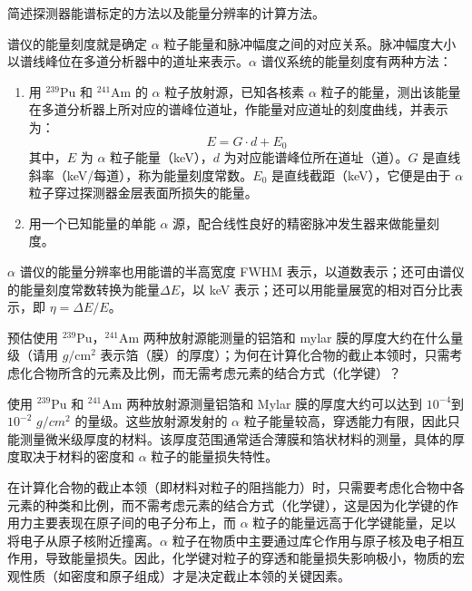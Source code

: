\documentclass[dvipsnames, svgnames,a4paper,11pt]{article}
\begin{document}
	

	


	




\begin{question}
	简述探测器能谱标定的方法以及能量分辨率的计算方法。
\end{question}

	谱仪的能量刻度就是确定 $\alpha$ 粒子能量和脉冲幅度之间的对应关系。脉冲幅度大小以谱线峰位在多道分析器中的道址来表示。$\alpha$ 谱仪系统的能量刻度有两种方法：

		\begin{enumerate}
			\item 用 $^{239} \mathrm{Pu}$ 和 $^{241} \mathrm{Am}$ 的 $\alpha$ 粒子放射源，已知各核素 $\alpha$ 粒子的能量，测出该能量在多道分析器上所对应的谱峰位道址，作能量对应道址的刻度曲线，并表示为：
			\[
				E = G \cdot d + E_0
			\]
			其中，$E$ 为 $\alpha$ 粒子能量（keV），$d$ 为对应能谱峰位所在道址（道）。$G$ 是直线斜率（keV/每道），称为能量刻度常数。$E_0$ 是直线截距（keV），它便是由于 $\alpha$ 粒子穿过探测器金层表面所损失的能量。


			\item 用一个已知能量的单能 $\alpha$ 源，配合线性良好的精密脉冲发生器来做能量刻度。
		\end{enumerate}

		$\alpha$ 谱仪的能量分辨率也用能谱的半高宽度 FWHM 表示，以道数表示；还可由谱仪的能量刻度常数转换为能量$\Delta E$，以 keV 表示；还可以用能量展宽的相对百分比表示，即 $\eta = \Delta E/E$。

	







\begin{question}
	预估使用 $^{239}\mathrm{Pu}$，$^{241}\mathrm{Am}$ 两种放射源能测量的铝箔和 mylar 膜的厚度大约在什么量级（请用 $g/\mathrm{cm}^2$ 表示箔（膜）的厚度）；为何在计算化合物的截止本领时，只需考虑化合物所含的元素及比例，而无需考虑元素的结合方式（化学键）？
\end{question}

	使用 $^{239}\mathrm{Pu}$ 和 $^{241}\mathrm{Am}$ 两种放射源测量铝箔和 Mylar 膜的厚度大约可以达到 $10^{-4}$到 $10^{-2}$ $g/cm^2$ 的量级。这些放射源发射的 $\alpha$ 粒子能量较高，穿透能力有限，因此只能测量微米级厚度的材料。该厚度范围通常适合薄膜和箔状材料的测量，具体的厚度取决于材料的密度和 $\alpha$ 粒子的能量损失特性。
	
	在计算化合物的截止本领（即材料对粒子的阻挡能力）时，只需要考虑化合物中各元素的种类和比例，而不需考虑元素的结合方式（化学键），这是因为化学键的作用力主要表现在原子间的电子分布上，而 $\alpha$ 粒子的能量远高于化学键能量，足以将电子从原子核附近撞离。$\alpha$ 粒子在物质中主要通过库仑作用与原子核及电子相互作用，导致能量损失。因此，化学键对粒子的穿透和能量损失影响极小，物质的宏观性质（如密度和原子组成）才是决定截止本领的关键因素。
\end{document}
